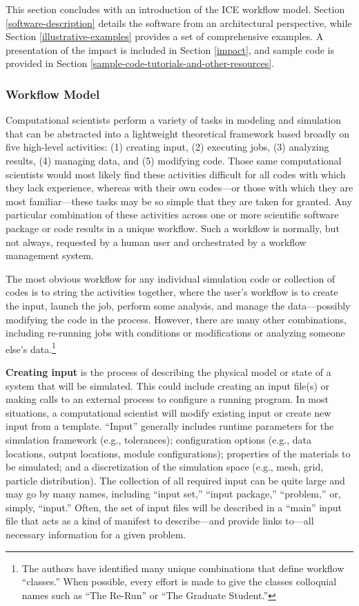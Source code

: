 This section concludes with an introduction of the ICE workflow model. Section \ref{software-description} details the software
from an architectural perspective, while Section \ref{illustrative-examples}
provides a set of comprehensive examples. A
presentation of the impact is included in Section \ref{impact}, and sample 
code is provided in Section \ref{sample-code-tutorials-and-other-resources}.

\subsubsection{Workflow Model}\label{workflow-model}

Computational scientists perform a variety of tasks in modeling and
simulation that can be abstracted into a lightweight theoretical
framework based broadly on five high-level activities: (1)
creating input, (2) executing jobs, (3) analyzing results, (4) managing
data, and (5) modifying code. Those same computational scientists would
most likely find these activities difficult for all codes with which
they lack experience, whereas with their own codes---or those with which
they are most familiar---these tasks may be so simple that they are
taken for granted. Any particular combination of these activities across
one or more scientific software package or code results in a unique
workflow. Such a workflow is normally, but not always, requested
by a human user and orchestrated by a workflow management system.

The most obvious workflow for any individual simulation code or
collection of codes is to string the activities together, where the user's
workflow is to create the input, launch the job, perform some analysis,
and manage the data---possibly modifying the code in the process. However, 
there are many other combinations, including re-running jobs with
conditions or modifications or analyzing someone else's data.\footnote{The
authors have identified many unique combinations that
define workflow ``classes.'' When possible, every effort is made to give the
classes colloquial names such as ``The Re-Run'' or ``The Graduate Student.''}

\textbf{Creating input} is the process of describing the physical model
or state of a system that will be simulated. This could include creating
an input file(s) or making calls to an external process to configure a
running program. In most situations, a computational scientist will
modify existing input or create new input from a template. ``Input''
generally includes runtime parameters for the simulation framework
(e.g., tolerances); configuration options (e.g., data locations, output
locations, module configurations); properties of the materials to be
simulated; and a discretization of the simulation space (e.g., mesh,
grid, particle distribution). The collection of all required input can
be quite large and may go by many names, including ``input set,''
``input package,'' ``problem,'' or, simply, ``input.'' Often, the set of
input files will be described in a ``main'' input file that acts as a
kind of manifest to describe---and provide links to---all necessary
information for a given problem.

